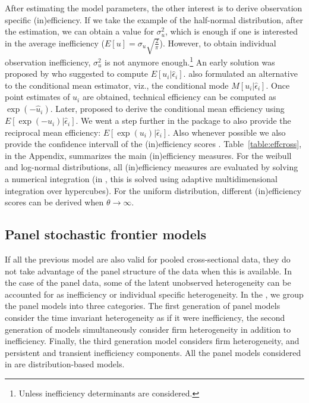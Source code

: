 \documentclass[nojss]{jss}
\begin{document}
After estimating the model parameters, the other interest is to derive observation 
specific (in)efficiency. If we take the example of the half-normal distribution, 
after the estimation, we can obtain a value for $\sigma_u^2$, which is enough if
one is interested in the average inefficiency 
($E\left[u\right]=\sigma_u\sqrt{\frac{2}{\pi}}$). However, to obtain individual
observation inefficiency, $\sigma_u^2$ is not anymore enough.\footnote{Unless 
inefficiency determinants are considered.} An early solution was proposed by \citet{jon82}
who suggested to compute $E\left[u_i|\hat{\epsilon}_i\right]$. \citet{jon82} also 
formulated an alternative to the conditional mean estimator, viz., the 
conditional mode $M\left[u_i|\hat{\epsilon}_i\right]$. Once point estimates of 
$u_i$ are obtained, technical efficiency can be computed as 
$\exp{\left(-\hat{u}_i\right)}$. Later, \citet{batt88} proposed to 
derive the conditional mean efficiency using $E\left[\exp{\left(-u_i\right)|\hat{\epsilon}_i}\right]$.
We went a step further in the  package to also provide the reciprocal
mean efficiency: $E\left[\exp{\left(u_i\right)|\hat{\epsilon}_i}\right]$.
Also whenever possible we also provide the confidence intervall of the (in)efficiency
scores \citep{horrace96}. Table~\ref{table:effcross}, in the Appendix, summarizes the main (in)efficiency measures. For the 
weibull and log-normal distributions, all (in)efficiency measures are evaluated
by solving a numerical integration (in , this 
is solved using adaptive multidimensional integration over hypercubes). For the
uniform distribution, different (in)efficiency scores can be derived when
$\theta \rightarrow \infty$.


\subsection{Panel stochastic frontier models}

If all the previous model are also valid for pooled cross-sectional data, they 
do not take advantage of the panel structure of the data when this is available. 
In the case of the panel data, some of the latent unobserved heterogeneity can 
be accounted for as inefficiency or individual specific heterogeneity. In the 
, we group the panel models into three categories. The first generation
of panel models consider the time invariant heterogeneity as if it were inefficiency, 
the second generation of models simultaneously consider firm heterogeneity in addition 
to inefficiency. Finally, the third generation model considers firm heterogeneity, 
and persistent and transient inefficiency components. All the panel models 
considered in  are distribution-based models.
\end{document}
